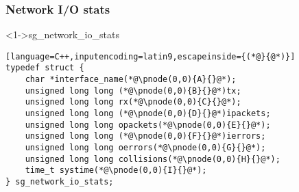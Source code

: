 \documentclass[ngerman,xcolor={table,dvipsnames},smaller,compress,hyperref={bookmarks,colorlinks}]{beamer}
\begin{document}
\begin{frame}[fragile]
\frametitle{Network I/O stats}
\begin{block}<1->{sg\_network\_io\_stats}
\tiny
\begin{lstlisting}[language=C++,inputencoding=latin9,escapeinside={(*@}{@*)}]
typedef struct {
    char *interface_name(*@\pnode(0,0){A}{}@*);
    unsigned long long (*@\pnode(0,0){B}{}@*)tx;
    unsigned long long rx(*@\pnode(0,0){C}{}@*);
    unsigned long long (*@\pnode(0,0){D}{}@*)ipackets;
    unsigned long long opackets(*@\pnode(0,0){E}{}@*);
    unsigned long long (*@\pnode(0,0){F}{}@*)ierrors;
    unsigned long long oerrors(*@\pnode(0,0){G}{}@*);
    unsigned long long collisions(*@\pnode(0,0){H}{}@*);
    time_t systime(*@\pnode(0,0){I}{}@*);
} sg_network_io_stats;
\end{lstlisting}
\end{block}

\scriptsize
{}
\begin{itemize}
\end{itemize}
\end{frame}
\end{document}
